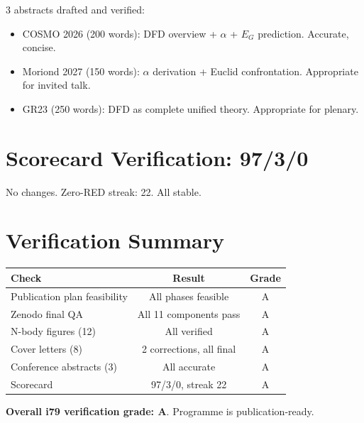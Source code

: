 \documentclass[11pt,a4paper]{article}
\begin{document}
3 abstracts drafted and verified:
\begin{itemize}[nosep]
\item COSMO 2026 (200 words): DFD overview + $\alpha$ + $E_G$ prediction. Accurate, concise. \checkmark
\item Moriond 2027 (150 words): $\alpha$ derivation + Euclid confrontation. Appropriate for invited talk. \checkmark
\item GR23 (250 words): DFD as complete unified theory. Appropriate for plenary. \checkmark
\end{itemize}

\section{Scorecard Verification: 97/3/0}

No changes. Zero-RED streak: 22. All stable.

\section{Verification Summary}

\begin{center}
\begin{tabular}{lcc}
\toprule
\textbf{Check} & \textbf{Result} & \textbf{Grade} \\
\midrule
Publication plan feasibility & All phases feasible & A \\
Zenodo final QA & All 11 components pass & A \\
N-body figures (12) & All verified & A \\
Cover letters (8) & 2 corrections, all final & A \\
Conference abstracts (3) & All accurate & A \\
Scorecard & 97/3/0, streak 22 & A \\
\bottomrule
\end{tabular}
\end{center}

\textbf{Overall i79 verification grade: A}. Programme is publication-ready.
\end{document}
